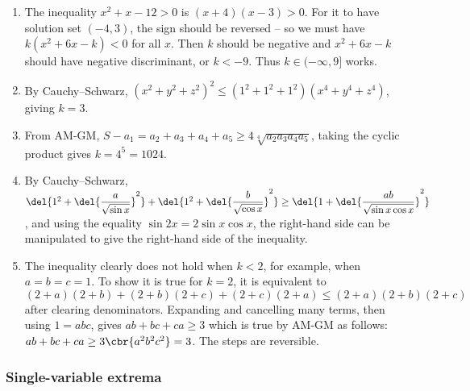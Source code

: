 \documentclass[10pt,paper=letter]{scrartcl}
\begin{document}
\begin{enumerate}

\item The inequality $x^2 + x - 12 > 0$ is $(x + 4)(x - 3) > 0$. For it to have solution set $(-4, 3)$, the sign should be reversed -- so we must have $k(x^2 + 6x - k) < 0$ for all $x$. Then $k$ should be negative and $x^2 + 6x - k$ should have negative discriminant, or $k < -9$. Thus $k \in (-\infty, 9]$ works.

\item By Cauchy--Schwarz, $(x^2 + y^2 + z^2)^2 \leq (1^2 + 1^2 + 1^2)(x^4 + y^4 + z^4)$, giving $k = 3$.

\item From AM-GM, $S - a_1 = a_2 + a_3 + a_4 + a_5 \geq 4\sqrt[4]{a_2a_3a_4a_5}$, taking the cyclic product gives $k = 4^5 = 1024$.

\item By Cauchy--Schwarz, $\del{1^2 + \del{\dfrac{a}{\sqrt{\sin x}}}^2} + \del{1^2 + \del{\dfrac{b}{\sqrt{\cos x}}}^2} \geq \del{1 + \del{\dfrac{ab}{\sqrt{\sin x\cos x}}}^2}$, and using the equality $\sin 2x = 2\sin x \cos x$, the right-hand side can be manipulated to give the right-hand side of the inequality.

\item The inequality clearly does not hold when $k < 2$, for example, when $a = b = c = 1$. To show it is true for $k = 2$, it is equivalent to $(2+a)(2+b) + (2+b)(2+c) + (2+c)(2+a) \leq (2+a)(2+b)(2+c)$ after clearing denominators. Expanding and cancelling many terms, then using $1 = abc$, gives $ab + bc + ca \geq 3$ which is true by AM-GM as follows: $ab + bc + ca \geq 3\cbr{a^2b^2c^2} = 3$. The steps are reversible.

\end{enumerate}

\subsubsection*{Single-variable extrema}
\end{document}
